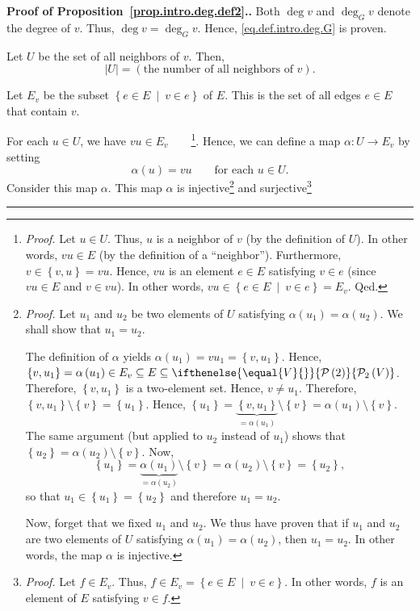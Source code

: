 \documentclass[numbers=enddot,12pt,final,onecolumn,notitlepage]{scrartcl}%
\theoremstyle{definition}
\newenvironment{proof}[1][Proof]{\noindent\textbf{#1.} }{\ \rule{0.5em}{0.5em}}
\newcommand{\powset}[2][]{\ifthenelse{\equal{#2}{}}{\mathcal{P}\left(#1\right)}{\mathcal{P}_{#1}\left(#2\right)}}
\newcommand{\set}[1]{\left\{ #1 \right\}}
\newcommand{\abs}[1]{\left| #1 \right|}
\newcommand{\tup}[1]{\left( #1 \right)}
\begin{document}
\begin{proof}[Proof of Proposition~\ref{prop.intro.deg.def2}.]Both
$\deg v$ and $\deg_G v$ denote the degree of $v$. Thus,
$\deg v = \deg_G v$. Hence, \eqref{eq.def.intro.deg.G} is proven.

Let $U$ be the set of all neighbors of $v$. Then,
\[
\abs{U}
= \left(\text{the number of all neighbors of } v\right) .
\]

Let $E_v$ be the subset $\set{e \in E \ \mid \ v \in e }$ of $E$. This
is the set of all edges $e \in E$ that contain $v$.

For each $u \in U$, we have
$vu \in E_v$\ \ \ \ \footnote{\textit{Proof.} Let $u \in U$. Thus, $u$
is a neighbor of $v$ (by the definition of $U$). In other words,
$vu \in E$ (by the definition of a ``neighbor''). Furthermore,
$v \in \set{v, u} = vu$. Hence, $vu$ is an element $e \in E$
satisfying $v \in e$ (since $vu \in E$ and $v \in vu$). In other
words, $vu \in \set{e \in E \ \mid \ v \in e } = E_v$. Qed.}.
Hence, we can define a map $\alpha : U \to E_v$ by setting
\[
\alpha\tup{u} = vu \qquad \text{for each } u \in U .
\]
Consider this map $\alpha$. This map $\alpha$ is
injective\footnote{\textit{Proof.} Let $u_1$ and $u_2$ be two elements
of $U$ satisfying $\alpha\tup{u_1} = \alpha\tup{u_2}$. We shall show
that $u_1 = u_2$.

The definition of $\alpha$ yields $\alpha\tup{u_1} = vu_1
= \set{v, u_1}$. Hence, $\set{v, u_1} = \alpha\tup{u_1} \in E_v
\subseteq E
\subseteq \powset[2]{V}$. Therefore, $\set{v, u_1}$ is a two-element
set. Hence, $v \neq u_1$. Therefore, $\set{v, u_1} \setminus \set{v}
= \set{u_1}$. Hence,
$\set{u_1}
= \underbrace{\set{v, u_1}}_{= \alpha\tup{u_1}} \setminus \set{v}
= \alpha\tup{u_1} \setminus \set{v}$.
The same argument (but applied to $u_2$ instead of $u_1$) shows that
$\set{u_2} = \alpha\tup{u_2} \setminus \set{v}$.
Now,
\[
\set{u_1}
= \underbrace{\alpha\tup{u_1}}_{= \alpha\tup{u_2}} \setminus \set{v}
= \alpha\tup{u_2} \setminus \set{v} = \set{u_2} ,
\]
so that
$u_1 \in \set{u_1} = \set{u_2}$ and therefore $u_1 = u_2$.

Now, forget that we fixed $u_1$ and $u_2$. We thus have proven that
if $u_1$ and $u_2$ are two elements of $U$ satisfying
$\alpha\tup{u_1} = \alpha\tup{u_2}$, then $u_1 = u_2$. In other words,
the map $\alpha$ is injective.} and
surjective\footnote{\textit{Proof.} Let $f \in E_v$. Thus,
$f \in E_v = \set{e \in E \ \mid \ v \in e }$. In other words, $f$
is an element of $E$ satisfying $v \in f$.

}
\end{proof}
\end{document}

